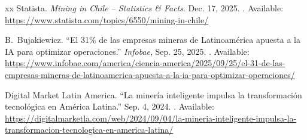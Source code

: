 \documentclass{ifacconf}
\begin{document}
\begin{thebibliography}{xx}
Statista.
\newblock \emph{Mining in Chile -- Statistics \& Facts}.
\newblock Dec. 17, 2025.
\newblock [Online]. Available: \url{https://www.statista.com/topics/6550/mining-in-chile/}

B.~Bujakiewicz.
\newblock ``El 31\% de las empresas mineras de Latinoam\'erica apuesta a la IA para optimizar operaciones.''
\newblock \emph{Infobae}, Sep. 25, 2025.
\newblock [Online]. Available: \url{https://www.infobae.com/america/ciencia-america/2025/09/25/el-31-de-las-empresas-mineras-de-latinoamerica-apuesta-a-la-ia-para-optimizar-operaciones/}

Digital Market Latin America.
\newblock ``La miner\'ia inteligente impulsa la transformaci\'on tecnol\'ogica en Am\'erica Latina.''
\newblock Sep. 4, 2024.
\newblock [Online]. Available: \url{https://digitalmarketla.com/web/2024/09/04/la-mineria-inteligente-impulsa-la-transformacion-tecnologica-en-america-latina/}

\end{thebibliography}

\end{document}
